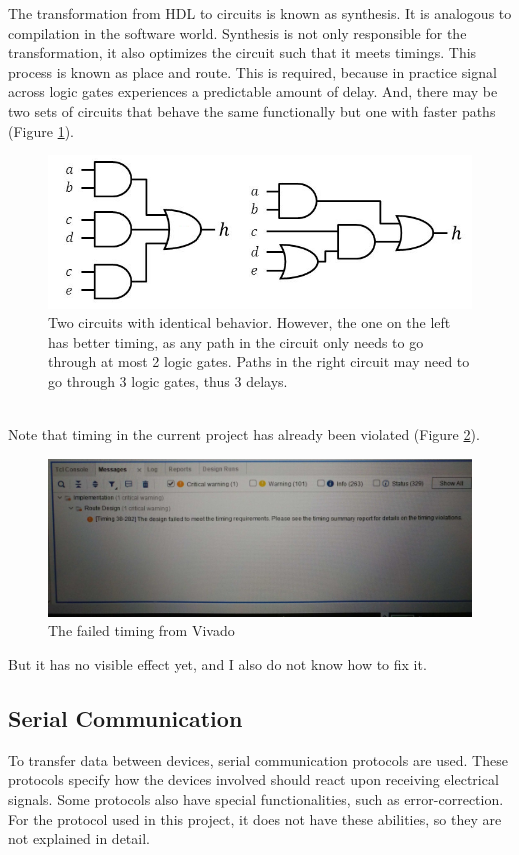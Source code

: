 \documentclass{article}
\begin{document}
		The transformation from HDL to circuits is known as synthesis. It is analogous to compilation in the software world. Synthesis is not only responsible for the transformation, it also optimizes the circuit such that it meets timings. This process is known as place and route. This is required, because in practice signal across logic gates experiences a predictable amount of delay. And, there may be two sets of circuits that behave the same functionally but one with faster paths (Figure \ref{fig:twolevel}).
	\begin{figure}[h]
		\centering
		\includegraphics[scale=0.6]{twolevel}
		\caption{Two circuits with identical behavior. However, the one on the left has better timing, as any path in the circuit only needs to go through at most 2 logic gates. Paths in the right circuit may need to go through 3 logic gates, thus 3 delays.}
		\label{fig:twolevel}
	\end{figure}
	\\
		
		Note that timing in the current project has already been violated (Figure \ref{fig:timing}).
	\begin{figure}[h]
		\centering
		\includegraphics[scale=0.2]{timing}
		\caption{The failed timing from Vivado}
		\label{fig:timing}
	\end{figure}But it has no visible effect yet, and I also do not know how to fix it.
	
	\subsection{Serial Communication}
		To transfer data between devices, serial communication protocols are used. These protocols specify how the devices involved should react upon receiving electrical signals. Some protocols also have special functionalities, such as error-correction. For the protocol used in this project, it does not have these abilities, so they are not explained in detail.
	\\
		
\end{document}
